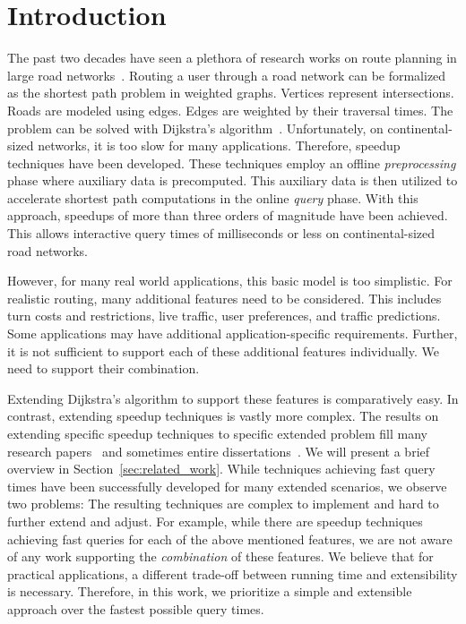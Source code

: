 \documentclass[manuscript,review]{acmart}
\begin{document}


\maketitle

\section{Introduction}
\label{sec:intro}
The past two decades have seen a plethora of research works on route planning in large road networks~\cite{bdgmpsww-rptn-16}.
Routing a user through a road network can be formalized as the shortest path problem in weighted graphs.
Vertices represent intersections.
Roads are modeled using edges.
Edges are weighted by their traversal times.
The problem can be solved with Dijkstra's algorithm~\cite{d-ntpcg-59}.
Unfortunately, on continental-sized networks, it is too slow for many applications.
Therefore, speedup techniques have been developed.
These techniques employ an offline \emph{preprocessing} phase where auxiliary data is precomputed.
This auxiliary data is then utilized to accelerate shortest path computations in the online \emph{query} phase.
With this approach, speedups of more than three orders of magnitude have been achieved.
This allows interactive query times of milliseconds or less on continental-sized road networks.

However, for many real world applications, this basic model is too simplistic.
For realistic routing, many additional features need to be considered.
This includes turn costs and restrictions, live traffic, user preferences, and traffic predictions.
Some applications may have additional application-specific requirements.
Further, it is not sufficient to support each of these additional features individually.
We need to support their combination.

Extending Dijkstra's algorithm to support these features is comparatively easy.
In contrast, extending speedup techniques is vastly more complex.
The results on extending specific speedup techniques to specific extended problem fill many research papers~\cite{gv-errnt-11,dgpw-crprn-13,dsw-cch-15,bwzz-cchtc-20,bgsv-mtdtt-13,swz-sfert-21} and sometimes entire dissertations~\cite{Delling2009_1000011046,b-tdrpc-14,Baum2018_1000082225}.
We will present a brief overview in Section~\ref{sec:related_work}.
While techniques achieving fast query times have been successfully developed for many extended scenarios, we observe two problems:
The resulting techniques are complex to implement and hard to further extend and adjust.
For example, while there are speedup techniques achieving fast queries for each of the above mentioned features, we are not aware of any work supporting the \emph{combination} of these features.
We believe that for practical applications, a different trade-off between running time and extensibility is necessary.
Therefore, in this work, we prioritize a simple and extensible approach over the fastest possible query times.
\end{document}
